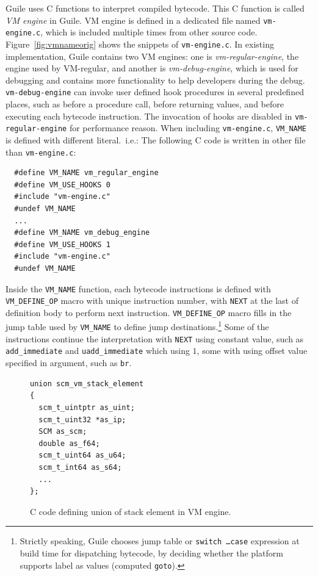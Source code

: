 \documentclass[preprint, 10pt]{sigplanconf}
\begin{document}
Guile uses C functions to interpret compiled bytecode. This C function is called
\textit{VM engine} in Guile. VM engine is defined in a dedicated file named
\texttt{vm-engine.c}, which is included multiple times from other source
code. Figure~\hyperref[fig:vmnameorig]{\ref{fig:vmnameorig}} shows the snippets
of \texttt{vm-engine.c}. In existing implementation, Guile contains two VM
engines: one is \textit{vm-regular-engine}, the engine used by VM-regular, and
another is \textit{vm-debug-engine}, which is used for debugging and contains
more functionality to help developers during the debug. \texttt{vm-debug-engine}
can invoke user defined hook procedures in several predefined places, such as
before a procedure call, before returning values, and before executing each
bytecode instruction. The invocation of hooks are disabled in
\texttt{vm-regular-engine} for performance reason. When including
\texttt{vm-engine.c}, \texttt{VM\_NAME} is defined with different
literal.\ i.e.: The following C code is written in other file than
\texttt{vm-engine.c}:

\begin{verbatim}
  #define VM_NAME vm_regular_engine
  #define VM_USE_HOOKS 0
  #include "vm-engine.c"
  #undef VM_NAME
  ...
  #define VM_NAME vm_debug_engine
  #define VM_USE_HOOKS 1
  #include "vm-engine.c"
  #undef VM_NAME
\end{verbatim}

Inside the \texttt{VM\_NAME} function, each bytecode instructions is defined
with \texttt{VM\_DEFINE\_OP} macro with unique instruction number, with
\texttt{NEXT} at the last of definition body to perform next
instruction. \texttt{VM\_DEFINE\_OP} macro fills in the jump table used by
\texttt{VM\_NAME} to define jump destinations.\footnote{Strictly speaking, Guile
  chooses jump table or \texttt{switch \ldots\@ case} expression at build time for
  dispatching bytecode, by deciding whether the platform supports label as
  values (computed \texttt{goto}).}  Some of the instructions continue the
interpretation with \texttt{NEXT} using constant value, such as
\texttt{add\_immediate} and \texttt{uadd\_immediate} which using $1$, some with
using offset value specified in argument, such as \texttt{br}.

\begin{figure}
  \centering
  \small
\begin{verbatim}
union scm_vm_stack_element
{
  scm_t_uintptr as_uint;
  scm_t_uint32 *as_ip;
  SCM as_scm;
  double as_f64;
  scm_t_uint64 as_u64;
  scm_t_int64 as_s64;
  ...
};
\end{verbatim}
\caption{C code defining union of stack element in VM engine.}
\label{fig:stackelem}
\end{figure}
\end{document}
